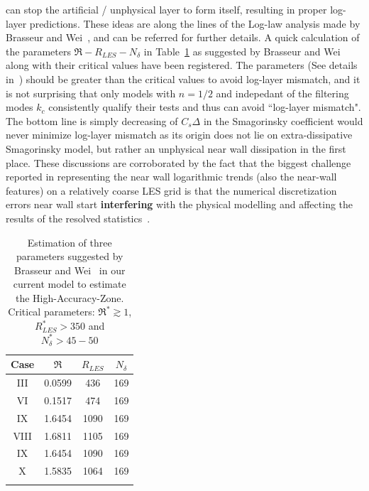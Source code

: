 can stop the artificial / unphysical layer to form itself, resulting in proper log-layer predictions. These ideas are along the lines of the Log-law analysis made by Brasseur and Wei~\cite{brass}, and can be referred for further details. A quick calculation of  the parameters $\mathfrak{R}-R_{LES}-N_{\delta}$ in Table~\ref{table:brass} as suggested by Brasseur and Wei~\cite{brass} along with their critical values have been registered. The parameters (See details in~\cite{brass}) should be greater than the critical values to avoid log-layer mismatch, and it is not surprising that only models with $n = 1/2$ and indepedant of the filtering modes $k_c$ consistently qualify their tests and thus can avoid ``log-layer mismatch". The bottom line is simply decreasing of $C_s\Delta$ in the Smagorinsky coefficient would never minimize log-layer mismatch as its origin does not lie on extra-dissipative Smagorinsky model, but rather an unphysical near wall dissipation in the first place. These discussions are corroborated by the fact that the biggest challenge reported in representing the near wall logarithmic trends (also the near-wall features) on a relatively co{a}rse LES grid  is that the {numerical discretization errors} near wall start \textbf{interfering} with the physical modelling and affecting the results of the resolved statistics~\cite{cabot2,brass,meyers2}.  
\begin{table}[ht] 
\centering %
\begin{tabular}{c c c c} %
\hline\hline    %
Case & $\mathfrak{R}$  & $R_{LES}$ & $N_{\delta}$   \\ [0.5 ex] %
\hline  %
III & 0.0599 & 436 & 169 \\
VI & 0.1517 & 474 & 169 \\
IX & 1.6454 & 1090 & 169 \\
\hline
VIII & 1.6811 & 1105 & 169 \\
IX & 1.6454 & 1090 & 169 \\
X & 1.5835 & 1064 & 169 \\
\hline \\ [1 ex]
\end{tabular} 
\caption[HAZ parameters of Brasseur and Wei (2010)]{Estimation of three parameters suggested by Brasseur and Wei~\cite{brass} in our current model to estimate the High-Accuracy-Zone. Critical parameters: $\mathfrak{R^{*}} \gtrsim 1$, $R_{LES}^{*} > 350$ and $N_{\delta}^{*} > 45-50$}  %
\label{table:brass} %
\end{table} 
